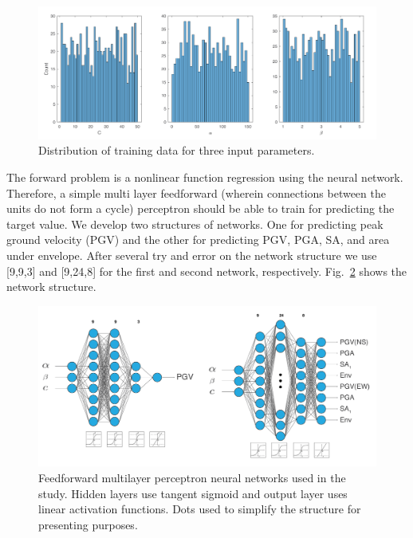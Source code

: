  \begin{figure}[ht]
    \centering
    \includegraphics[width=\textwidth]{figures/pdf/Figure_training_data_statistics.pdf}
    \caption{Distribution of training data for three input parameters.}
    \label{fig:Figure_training_data_statistics}
\end{figure}

The forward problem is a nonlinear function regression using the neural network. Therefore,  a simple multi layer feedforward (wherein connections between the units do not form a cycle) perceptron should be able to train for predicting the target value. We develop two structures  of networks. One for predicting peak ground velocity (PGV) and the other for predicting PGV, PGA, SA, and area under envelope. After several try and error on the network structure we use [9,9,3] and [9,24,8] for the first and second network, respectively. Fig.~\ref{fig:Figure_ann_structure} shows the network structure. 

 \begin{figure}
    \centering
    \includegraphics[width=1\textwidth]{figures/pdf/Figure_ann_structure.pdf}
    \caption{Feedforward multilayer perceptron neural networks used in the study. Hidden layers use tangent sigmoid and output layer uses linear activation functions. Dots used to simplify the structure for presenting purposes.}
    \label{fig:Figure_ann_structure}
\end{figure}

